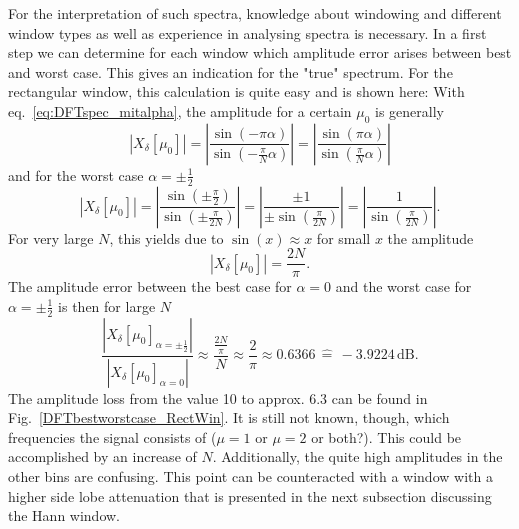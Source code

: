 \documentclass[11pt,a4paper,DIV=12]{scrartcl}
\begin{document}
For the interpretation of such spectra, knowledge about windowing and different
window types as well as experience in analysing spectra is necessary.
%
In a first step we can determine for each window which amplitude error arises
between best and worst case.
%
This gives an indication for the "true" spectrum.
%
For the rectangular window, this calculation is quite easy and is shown here:
%
With eq.~\eqref{eq:DFTspec_mitalpha}, the amplitude for a certain $\mu_0$ is
generally
%
\begin{equation}
|X_\delta[\mu_0]|=\left|\frac{\sin(-\pi\alpha)}{\sin\left(-\frac{\pi}{N}\alpha\right)}\right|
=\left|\frac{\sin(\pi\alpha)}{\sin\left(\frac{\pi}{N}\alpha\right)}\right|
\end{equation}
%
and for the worst case $\alpha=\pm\frac{1}{2}$
%
\begin{equation}
|X_\delta[\mu_0]|=\left|\frac{\sin\left(\pm\frac{\pi}{2}\right)}{\sin\left(\pm\frac{\pi}{2N}\right)}\right|
=\left|\frac{\pm1}{\pm\sin\left(\frac{\pi}{2N}\right)}\right|
=\left|\frac{1}{\sin\left(\frac{\pi}{2N}\right)}\right|.
\end{equation}
%
For very large $N$, this yields due to $\sin(x)\approx x$ for small $x$ the
amplitude
%
\begin{equation}
|X_\delta[\mu_0]|=\frac{2N}{\pi}.
\end{equation}
%
The amplitude error between the best case for $\alpha=0$ and the worst case for
$\alpha=\pm\frac{1}{2}$ is then for large $N$
%
\begin{equation}
\frac{\left|X_\delta[\mu_0]_{\alpha=\pm\frac{1}{2}}\right|}{\left|X_\delta[\mu_0]_{\alpha=0}\right|}\approx\frac{\frac{2N}{\pi}}{N}\approx\frac{2}{\pi}\approx0.6366\,\hat{=}\,-3.9224\,\text{dB}.
\end{equation}
%
The amplitude loss from the value 10 to approx. 6.3 can be found in
Fig.~\ref{DFTbestworstcase_RectWin}.
%
It is still not known, though, which frequencies the signal consists of
($\mu=1$ or $\mu=2$ or both?).
%
This could be accomplished by an increase of $N$.
%
Additionally, the quite high amplitudes in the other bins are confusing.
%
This point can be counteracted with a window with a higher side lobe
attenuation that is presented in the next subsection discussing the Hann
window.

\end{document}

